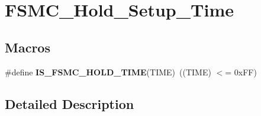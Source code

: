 \hypertarget{group___f_s_m_c___hold___setup___time}{\section{F\-S\-M\-C\-\_\-\-Hold\-\_\-\-Setup\-\_\-\-Time}
\label{group___f_s_m_c___hold___setup___time}
}
\subsection*{Macros}
\begin{DoxyCompactItemize}
\item 
\hypertarget{group___f_s_m_c___hold___setup___time_gab2abc8eb967495f2a2bafec8162d6385}{\#define {\bfseries I\-S\-\_\-\-F\-S\-M\-C\-\_\-\-H\-O\-L\-D\-\_\-\-T\-I\-M\-E}(T\-I\-M\-E)~((T\-I\-M\-E) $<$= 0x\-F\-F)}\label{group___f_s_m_c___hold___setup___time_gab2abc8eb967495f2a2bafec8162d6385}

\end{DoxyCompactItemize}


\subsection{Detailed Description}

